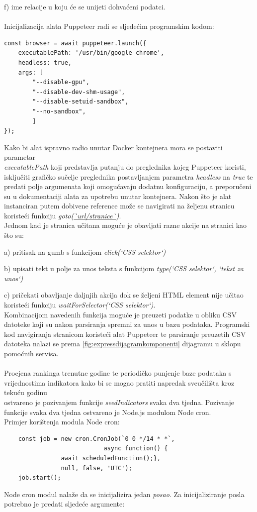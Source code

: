 \documentclass[times, utf8, zavrsni]{fer}
\begin{document}
    f) ime relacije u koju će se unijeti dohvaćeni podatci.
\\\\Inicijalizacija alata Puppeteer radi se sljedećim programskim kodom:
\begin{verbatim}  
const browser = await puppeteer.launch({
    executablePath: '/usr/bin/google-chrome',
    headless: true,
    args: [
        "--disable-gpu",
        "--disable-dev-shm-usage",
        "--disable-setuid-sandbox",
        "--no-sandbox",
        ]
});
\end{verbatim} 
Kako bi alat ispravno radio unutar Docker kontejnera mora se postaviti parametar \\\emph{executablePath} koji predstavlja putanju 
do preglednika kojeg Puppeteer koristi, isključiti grafičko sučelje preglednika postavljanjem parametra \emph{headless} na \emph{true} te predati 
polje argumenata koji omogućavaju dodatnu konfiguraciju, a preporučeni su u dokumentaciji alata za upotrebu unutar kontejnera.
Nakon što je alat instanciran putem dobivene reference može se navigirati na željenu stranicu koristeći funkciju \emph{goto(\url{`url/stranice`})}.
\\Jednom kad je stranica učitana moguće je obavljati razne akcije na stranici kao što su:

    a) pritisak na gumb s funkcijom \emph{click(`CSS selektor`)}

    b) upisati tekt u polje za unos teksta s funkcijom \emph{type(`CSS selektor`, `tekst za unos`)}

    c) pričekati obavljanje daljnjih akcija dok se željeni HTML element nije učitao koristeći funkciju \emph{waitForSelector(`CSS selektor`)}.
\\Kombinacijom navedenih funkcija moguće je preuzeti podatke u obliku CSV datoteke koji su nakon parsiranja spremni za unos u bazu podataka.
Programski kod navigiranja stranicom koristeći alat Puppeteer te parsiranje preuzetih CSV datoteka nalazi se prema \ref{fig:expressdijagramkomponenti}
dijagramu u sklopu pomoćnih servisa.
\\\\Procjena rankinga trenutne godine te periodičko punjenje baze podataka s vrijednostima indikatora kako bi se mogao pratiti napredak 
sveučilišta kroz tekuću godinu \\ostvareno je pozivanjem funkcije \emph{seedIndicators} svaka dva tjedna. Pozivanje funkcije svaka dva tjedna 
ostvareno je Node.js modulom Node cron. 
\\Primjer korištenja modula Node cron:
\begin{verbatim}  
    const job = new cron.CronJob(`0 0 */14 * *`, 
                            async function() {
                await scheduledFunction();}, 
                null, false, 'UTC');
    job.start();
\end{verbatim}
Node cron modul nalaže da se inicijalizira jedan \emph{posao}. Za inicijaliziranje posla potrebno je predati sljedeće argumente:
\end{document}
